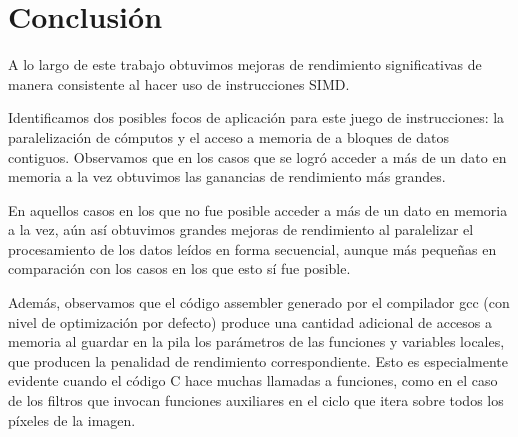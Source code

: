 \documentclass[a4paper,10pt,twoside]{article}
\begin{document}
\section{Conclusión}

A lo largo de este trabajo obtuvimos mejoras de rendimiento significativas de manera consistente al hacer uso de instrucciones SIMD. 

Identificamos dos posibles focos de aplicación para este juego de instrucciones: la paralelización de cómputos y el acceso a memoria de a bloques de datos contiguos. Observamos que en los casos que se logró acceder a más de un dato en memoria a la vez obtuvimos las ganancias de rendimiento más grandes.

En aquellos casos en los que no fue posible acceder a más de un dato en memoria a la vez, aún así obtuvimos grandes mejoras de rendimiento al paralelizar el procesamiento de los datos leídos en forma secuencial, aunque más pequeñas en comparación con los casos en los que esto sí fue posible.

Además, observamos que el código assembler generado por el compilador gcc (con nivel de optimización por defecto) produce una cantidad adicional de accesos a memoria al guardar en la pila los parámetros de las funciones y variables locales, que producen la penalidad de rendimiento correspondiente. Esto es especialmente evidente cuando el código C hace muchas llamadas a funciones, como en el caso de los filtros que invocan funciones auxiliares en el ciclo que itera sobre todos los píxeles de la imagen.
\end{document}

